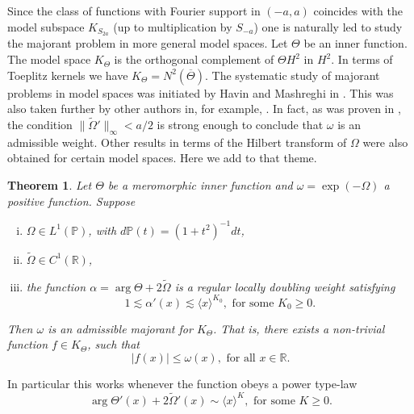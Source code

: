 \documentclass{article}[12pt]
\newcommand{\norm}[1]{\lVert#1\rVert}
\newtheorem{theorem}{Theorem}
\theoremstyle{remark}
\begin{document}
    Since the class of functions with Fourier support in $(-a,a)$ coincides with the model subspace $K_{S_{2a}}$ (up to multiplication by $S_{-a}$) one is naturally led to study the majorant problem in more general model spaces. Let $\Theta$ be an inner function. The model space $K_{\Theta}$ is the orthogonal complement of $\Theta H^{2}$ in $H^{2}$. In terms of Toeplitz kernels we have $K_{\Theta} = N^{2}(\overline{\Theta})$. The systematic study of majorant problems in model spaces was initiated by Havin and Mashreghi in \cite{MR2016246, MR2016247}. This was also taken further by other authors in, for example, \cite{MR2473742, MR2241422, MR2423994}. In fact, as was proven in \cite{MR2016247}, the condition $\norm{\widetilde{\Omega}'}_{\infty} < a/2$ is strong enough to conclude that $\omega$ is an admissible weight. Other results in terms of the Hilbert transform of $\Omega$ were also obtained for certain model spaces. Here we add to that theme.
    \begin{theorem}\label{thm:BM_majorant}
        Let $\Theta$ be a meromorphic inner function and $\omega = \exp(-\Omega)$ a positive function. Suppose
        \begin{enumerate}[(i)]
            \item $\Omega \in L^{1}(\mathbb{P})$, with $d\mathbb{P}(t) = (1+t^{2})^{-1}dt$,
            \item $\widetilde{\Omega} \in C^{1}(\mathbb{R})$,
            \item the function $\alpha = \arg \Theta + 2\widetilde{\Omega}$ is a regular locally doubling weight satisfying
            \begin{equation*}
                1 \lesssim\alpha'(x) \lesssim \langle x\rangle^{K_{0}}, \text{ for some } K_{0} \geq 0.
            \end{equation*}
        \end{enumerate}
        Then $\omega$ is an admissible majorant for $K_{\Theta}$. That is, there exists a non-trivial function $f \in K_{\Theta}$, such that
        \begin{equation*}
            \lvert f(x) \rvert \leq \omega(x), \text{ for all } x \in \mathbb{R}.
        \end{equation*}
    \end{theorem}
    In particular this works whenever the function obeys a power type-law
    \begin{equation*}
        \arg \Theta'(x) + 2\widetilde{\Omega}'(x) \sim \langle x \rangle^{K}, \text{ for some } K \geq 0.
    \end{equation*}
\end{document}
